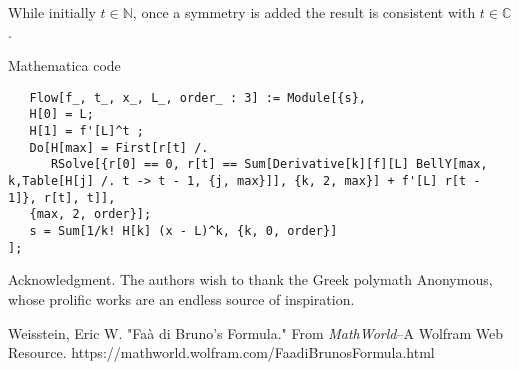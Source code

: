 \documentclass{article}
\theoremstyle{definition}
\begin{document}
While initially $t \in \mathbb{N}$, once a symmetry is added the result is consistent with $t \in \mathbb{C}$.

Mathematica code
\begin{verbatim}
   Flow[f_, t_, x_, L_, order_ : 3] := Module[{s},
   H[0] = L;
   H[1] = f'[L]^t ;
   Do[H[max] = First[r[t] /. 
      RSolve[{r[0] == 0, r[t] == Sum[Derivative[k][f][L] BellY[max, k,Table[H[j] /. t -> t - 1, {j, max}]], {k, 2, max}] + f'[L] r[t - 1]}, r[t], t]], 
   {max, 2, order}];
   s = Sum[1/k! H[k] (x - L)^k, {k, 0, order}]
];
\end{verbatim}

\begin{acknowledgment}{Acknowledgment.}
The authors wish to thank the Greek polymath Anonymous, whose prolific works are an endless source of inspiration.
\end{acknowledgment}

\begin{thebibliography}{1}
 Weisstein, Eric W. "Faà di Bruno's Formula." From \textit{MathWorld}--A Wolfram Web Resource. https://mathworld.wolfram.com/FaadiBrunosFormula.html

\end{thebibliography}


\vfill\eject
\end{document}
